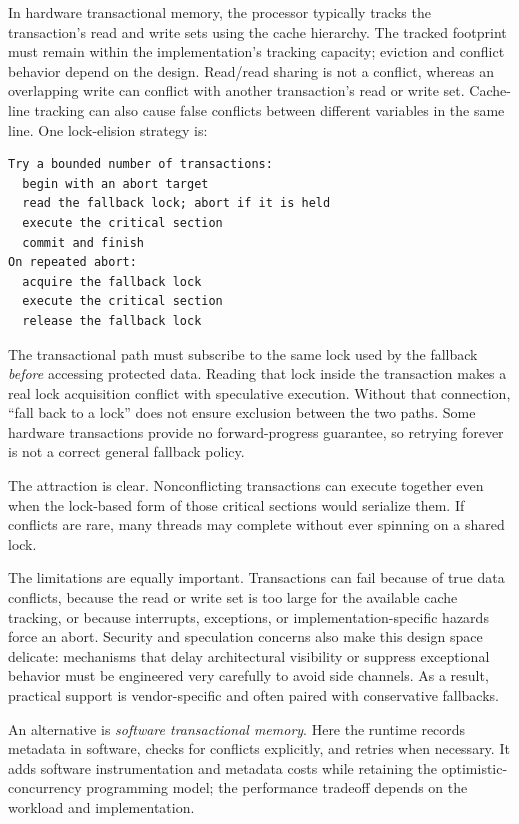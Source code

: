 In hardware transactional memory, the processor typically tracks the transaction's read and write sets using the cache hierarchy.
The tracked footprint must remain within the implementation's tracking capacity; eviction and conflict behavior depend on the design.
Read/read sharing is not a conflict, whereas an overlapping write can conflict with another transaction's read or write set.
Cache-line tracking can also cause false conflicts between different variables in the same line.
One lock-elision strategy is:
\begin{verbatim}
Try a bounded number of transactions:
  begin with an abort target
  read the fallback lock; abort if it is held
  execute the critical section
  commit and finish
On repeated abort:
  acquire the fallback lock
  execute the critical section
  release the fallback lock
\end{verbatim}
The transactional path must subscribe to the same lock used by the fallback \emph{before} accessing protected data.
Reading that lock inside the transaction makes a real lock acquisition conflict with speculative execution.
Without that connection, ``fall back to a lock'' does not ensure exclusion between the two paths.
Some hardware transactions provide no forward-progress guarantee, so retrying forever is not a correct general fallback policy.

The attraction is clear.
Nonconflicting transactions can execute together even when the lock-based form of those critical sections would serialize them.
If conflicts are rare, many threads may complete without ever spinning on a shared lock.

The limitations are equally important.
Transactions can fail because of true data conflicts, because the read or write set is too large for the available cache tracking, or because interrupts, exceptions, or implementation-specific hazards force an abort.
Security and speculation concerns also make this design space delicate: mechanisms that delay architectural visibility or suppress exceptional behavior must be engineered very carefully to avoid side channels.
As a result, practical support is vendor-specific and often paired with conservative fallbacks.

An alternative is \textit{software transactional memory}.
Here the runtime records metadata in software, checks for conflicts explicitly, and retries when necessary.
It adds software instrumentation and metadata costs while retaining the optimistic-concurrency programming model; the performance tradeoff depends on the workload and implementation.


